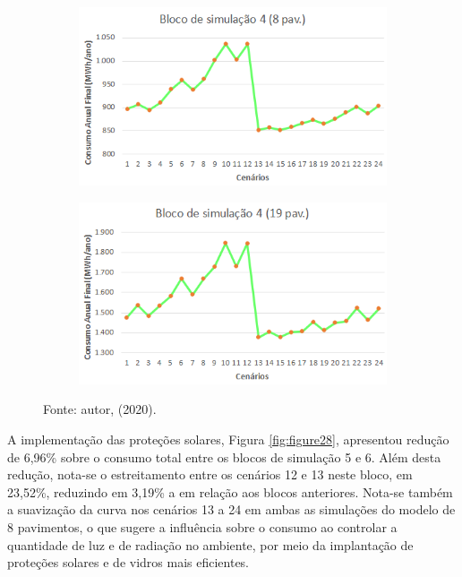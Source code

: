 \begin{figure}[H]
    \centering
    \caption{Gráficos dos blocos de simulação de PAF\textsuperscript{T} dos modelos genérico de 8 (esq.) e 19 pavimentos (dir.).}
    \begin{subfigure}[b]{0.49\textwidth}
        \includegraphics[width=\textwidth]{figures/result/fig33-bloco4.png}
    \end{subfigure}
    \begin{subfigure}[b]{0.49\textwidth}
        \includegraphics[width=\textwidth]{figures/result/fig34-bloco4.png}
    \end{subfigure}
    \begin{flushleft}
        \par \small Fonte: autor, (2020).
    \end{flushleft}
    \label{fig:figure27}
\end{figure}
A implementação das proteções solares, Figura \ref{fig:figure28}, apresentou redução de 6,96\% sobre o consumo total entre os blocos de simulação 5 e 6. Além desta redução, nota-se o estreitamento entre os cenários 12 e 13 neste bloco, em 23,52\%, reduzindo em 3,19\% a em relação aos blocos anteriores. Nota-se também a suavização da curva nos cenários 13 a 24 em ambas as simulações do modelo de 8 pavimentos, o que sugere a influência sobre o consumo ao controlar a quantidade de luz e de radiação no ambiente, por meio da implantação de proteções solares e de vidros mais eficientes.
